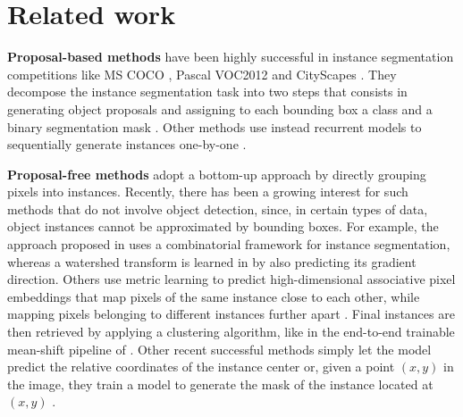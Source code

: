 
\section{Related work} \label{sec:related_work}

\textbf{Proposal-based methods} have been highly successful in instance segmentation competitions like MS COCO \cite{lin2014microsoft}, Pascal VOC2012 \cite{everingham2010pascal} and CityScapes \cite{cordts2016cityscapes}. They decompose the instance segmentation task into two steps that consists in generating object proposals and assigning to each bounding box a class and a binary segmentation mask \cite{he2017mask,porzi2019seamless,liu2018path,yang2012layered,li2017fully,ladicky2010and,hariharan2014simultaneous,chen2015multi,dai2016instance,liang2016reversible}. 
Other methods use instead recurrent models to sequentially generate instances one-by-one \cite{romera2016recurrent,ren2017end}.

\textbf{Proposal-free methods} adopt a bottom-up approach by directly grouping pixels into instances. Recently, there has been a growing interest for such  methods that do not involve object detection, since, in certain types of data, object instances cannot be approximated by bounding boxes. For example, the approach proposed in \cite{kirillov2017instancecut} uses a combinatorial framework for instance segmentation, 
whereas a watershed transform is learned in \cite{bai2017deep} by also predicting its gradient direction. 
Others use metric learning to predict high-dimensional associative pixel embeddings that map pixels of the same instance close to each other, while mapping pixels belonging to different instances further apart \cite{lee2019learning,fathi2017semantic,newell2017associative,de2017semantic}. %
Final instances are then retrieved by applying a clustering algorithm, like in the end-to-end trainable mean-shift pipeline of \cite{kong2018recurrentPix}. 
Other recent successful methods simply let the model predict the relative coordinates of the instance center \cite{neven2019instance,cheng2019panopticdeeplab} or, given a point $(x,y)$ in the image, they train a model to generate the mask of the instance located at $(x,y)$ \cite{sofiiuk2019adaptis}. 

